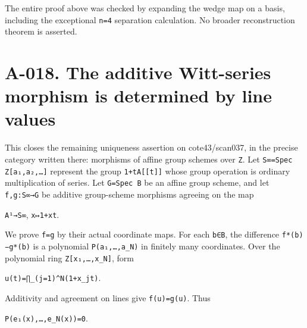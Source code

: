 \documentclass[
  10pt,
]{article}
\begin{document}
The entire proof above was checked by expanding the wedge map on a
basis, including the exceptional \texttt{\small n=\allowbreak{}4}
separation calculation. No broader reconstruction theorem is asserted.

\section{A-018. The additive Witt-series morphism is determined by line
values}\label{a-018.-the-additive-witt-series-morphism-is-determined-by-line-values}

This closes the remaining uniqueness assertion on cote43/scan037, in the
precise category written there: morphisms of affine group schemes over
\texttt{\small Z}. Let
\texttt{\small S∞=\allowbreak{}Spec Z[\allowbreak{}a₁,\allowbreak{}a₂,\allowbreak{}…]\allowbreak{}}
represent the group
\texttt{\small 1+\allowbreak{}tA[\allowbreak{}[\allowbreak{}t]\allowbreak{}]\allowbreak{}}
whose group operation is ordinary multiplication of series. Let
\texttt{\small G=\allowbreak{}Spec B} be an affine group scheme, and let
\texttt{\small f,\allowbreak{}g:\allowbreak{}S∞→\allowbreak{}G} be
additive group-scheme morphisms agreeing on the map

\texttt{\small A¹→\allowbreak{}S∞}, \texttt{\small x↦1+\allowbreak{}xt}.

We prove \texttt{\small f=\allowbreak{}g} by their actual coordinate
maps. For each \texttt{\small b∈B}, the difference
\texttt{\small f*(\allowbreak{}b)\allowbreak{}−g*(\allowbreak{}b)\allowbreak{}}
is a polynomial
\texttt{\small P(\allowbreak{}a₁,\allowbreak{}…,\allowbreak{}a\_\allowbreak{}N)\allowbreak{}}
in finitely many coordinates. Over the polynomial ring
\texttt{\small Z[\allowbreak{}x₁,\allowbreak{}…,\allowbreak{}x\_\allowbreak{}N]\allowbreak{}},
form

\texttt{\small u(\allowbreak{}t)\allowbreak{}=\allowbreak{}∏\_\allowbreak{}(\allowbreak{}j=\allowbreak{}1)\allowbreak{}\textasciicircum{}N(\allowbreak{}1+\allowbreak{}x\_\allowbreak{}jt)\allowbreak{}}.

Additivity and agreement on lines give
\texttt{\small f(\allowbreak{}u)\allowbreak{}=\allowbreak{}g(\allowbreak{}u)\allowbreak{}}.
Thus

\texttt{\small P(\allowbreak{}e₁(\allowbreak{}x)\allowbreak{},\allowbreak{}…,\allowbreak{}e\_\allowbreak{}N(\allowbreak{}x)\allowbreak{})\allowbreak{}=\allowbreak{}0}.
\end{document}

